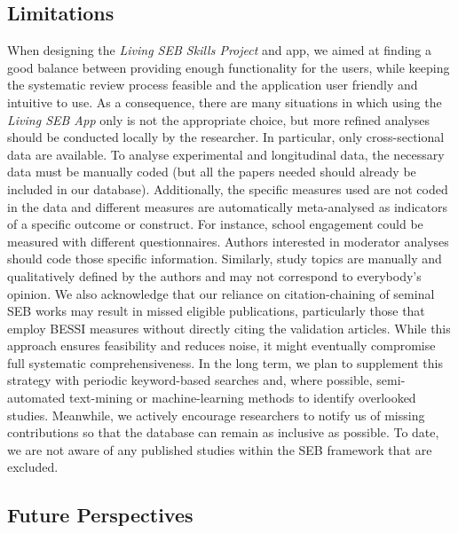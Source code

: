 \documentclass[
  man,
  longtable,
  nolmodern,
  notxfonts,
  notimes,
  colorlinks=true,linkcolor=blue,citecolor=blue,urlcolor=blue]{apa7}
\begin{document}
\subsection{Limitations}\label{limitations}

When designing the \emph{Living SEB Skills Project} and app, we aimed at
finding a good balance between providing enough functionality for the
users, while keeping the systematic review process feasible and the
application user friendly and intuitive to use. As a consequence, there
are many situations in which using the \emph{Living SEB App} only is not
the appropriate choice, but more refined analyses should be conducted
locally by the researcher. In particular, only cross-sectional data are
available. To analyse experimental and longitudinal data, the necessary
data must be manually coded (but all the papers needed should already be
included in our database). Additionally, the specific measures used are
not coded in the data and different measures are automatically
meta-analysed as indicators of a specific outcome or construct. For
instance, school engagement could be measured with different
questionnaires. Authors interested in moderator analyses should code
those specific information. Similarly, study topics are manually and
qualitatively defined by the authors and may not correspond to
everybody's opinion. We also acknowledge that our reliance on
citation-chaining of seminal SEB works may result in missed eligible
publications, particularly those that employ BESSI measures without
directly citing the validation articles. While this approach ensures
feasibility and reduces noise, it might eventually compromise full
systematic comprehensiveness. In the long term, we plan to supplement
this strategy with periodic keyword-based searches and, where possible,
semi-automated text-mining or machine-learning methods to identify
overlooked studies. Meanwhile, we actively encourage researchers to
notify us of missing contributions so that the database can remain as
inclusive as possible. To date, we are not aware of any published
studies within the SEB framework that are excluded.

\subsection{Future Perspectives}\label{future-perspectives}
\end{document}
